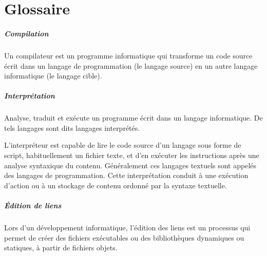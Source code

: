 	\chapter{Glossaire}
	\paragraph{Compilation} Un compilateur est un programme informatique qui transforme un code source écrit dans un langage de programmation (le langage source) en un autre langage informatique (le langage cible).
	\paragraph{Interprétation}
	Analyse, traduit et exécute un programme écrit dans un langage informatique. De tels langages sont dits langages interprétés.

	L'interpréteur est capable de lire le code source d'un langage sous forme de script, habituellement un fichier texte, et d'en exécuter les instructions après une analyse syntaxique du contenu. Généralement ces langages textuels sont appelés des langages de programmation. Cette interprétation conduit à une exécution d'action ou à un stockage de contenu ordonné par la syntaxe textuelle.  \paragraph{Édition de liens} Lors d’un développement informatique, l'édition des liens est un processus qui permet de créer des fichiers exécutables ou des bibliothèques dynamiques ou statiques, à partir de fichiers objets.
	\lstlistoflistings{}

